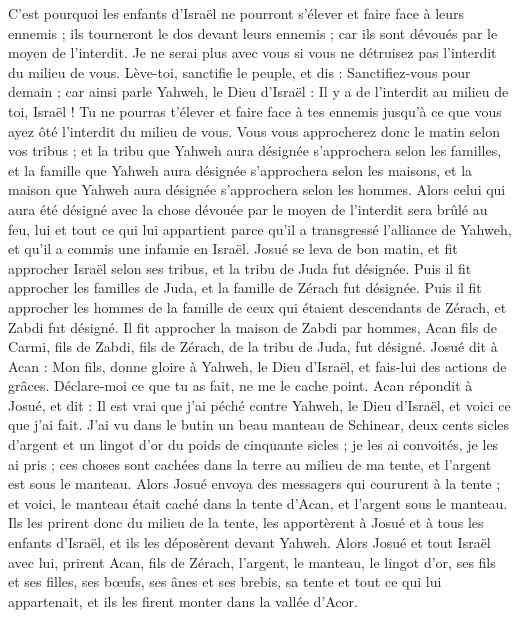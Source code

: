\begin{multicols}{2}
C’est pourquoi les enfants d’Israël ne pourront s’élever et faire face à leurs ennemis ; ils tourneront le dos devant leurs ennemis ; car ils sont dévoués par le moyen de l'interdit. Je ne serai plus avec vous si vous ne détruisez pas l’interdit du milieu de vous.
Lève-toi, sanctifie le peuple, et dis : Sanctifiez-vous pour demain ; car ainsi parle Yahweh, le Dieu d’Israël : Il y a de l’interdit au milieu de toi, Israël ! Tu ne pourras t’élever et faire face à tes ennemis jusqu’à ce que vous ayez ôté l’interdit du milieu de vous.
Vous vous approcherez donc le matin selon vos tribus ; et la tribu que Yahweh aura désignée s’approchera selon les familles, et la famille que Yahweh aura désignée s’approchera selon les maisons, et la maison que Yahweh aura désignée s’approchera selon les hommes.
Alors celui qui aura été désigné avec la chose dévouée par le moyen de l'interdit sera brûlé au feu, lui et tout ce qui lui appartient parce qu’il a transgressé l’alliance de Yahweh, et qu’il a commis une infamie en Israël.
Josué se leva de bon matin, et fit approcher Israël selon ses tribus, et la tribu de Juda fut désignée.
Puis il fit approcher les familles de Juda, et la famille de Zérach fut désignée. Puis il fit approcher les hommes de la famille de ceux qui étaient descendants de Zérach, et Zabdi fut désigné.
Il fit approcher la maison de Zabdi par hommes, Acan fils de Carmi, fils de Zabdi, fils de Zérach, de la tribu de Juda, fut désigné.
Josué dit à Acan : Mon fils, donne gloire à Yahweh, le Dieu d’Israël, et fais-lui des actions de grâces. Déclare-moi ce que tu as fait, ne me le cache point.
Acan répondit à Josué, et dit : Il est vrai que j’ai péché contre Yahweh, le Dieu d’Israël, et voici ce que j’ai fait.
J’ai vu dans le butin un beau manteau de Schinear\FTNT{}, deux cents sicles d’argent et un lingot d’or du poids de cinquante sicles ; je les ai convoités, je les ai pris ; ces choses sont cachées dans la terre au milieu de ma tente, et l’argent est sous le manteau.
Alors Josué envoya des messagers qui coururent à la tente ; et voici, le manteau était caché dans la tente d’Acan, et l’argent sous le manteau.
Ils les prirent donc du milieu de la tente, les apportèrent à Josué et à tous les enfants d’Israël, et ils les déposèrent devant Yahweh.
Alors Josué et tout Israël avec lui, prirent Acan, fils de Zérach, l’argent, le manteau, le lingot d’or, ses fils et ses filles, ses bœufs, ses ânes et ses brebis, sa tente et tout ce qui lui appartenait, et ils les firent monter dans la vallée d’Acor.

\end{multicols}
